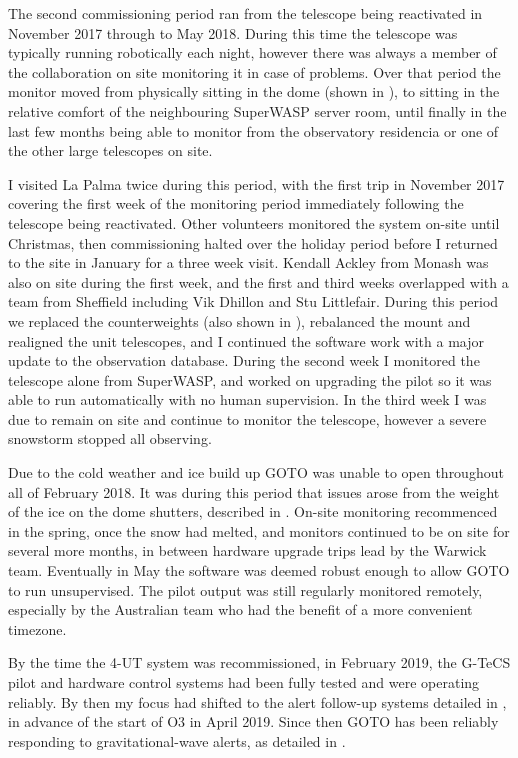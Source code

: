 \begin{colsection}
\begin{colsection}
The second commissioning period ran from the telescope being reactivated in November 2017 through to May 2018. During this time the telescope was typically running robotically each night, however there was always a member of the collaboration on site monitoring it in case of problems. Over that period the monitor moved from physically sitting in the dome (shown in ), to sitting in the relative comfort of the neighbouring SuperWASP server room, until finally in the last few months being able to monitor from the observatory residencia or one of the other large telescopes on site.

I visited La Palma twice during this period, with the first trip in November 2017 covering the first week of the monitoring period immediately following the telescope being reactivated. Other volunteers monitored the system on-site until Christmas, then commissioning halted over the holiday period before I returned to the site in January for a three week visit. Kendall Ackley from Monash was also on site during the first week, and the first and third weeks overlapped with a team from Sheffield including Vik Dhillon and Stu Littlefair. During this period we replaced the counterweights (also shown in ), rebalanced the mount and realigned the unit telescopes, and I continued the software work with a major update to the observation database. During the second week I monitored the telescope alone from SuperWASP, and worked on upgrading the pilot so it was able to run automatically with no human supervision. In the third week I was due to remain on site and continue to monitor the telescope, however a severe snowstorm stopped all observing.

Due to the cold weather and ice build up GOTO was unable to open throughout all of February 2018. It was during this period that issues arose from the weight of the ice on the dome shutters, described in . On-site monitoring recommenced in the spring, once the snow had melted, and monitors continued to be on site for several more months, in between hardware upgrade trips lead by the Warwick team. Eventually in May the software was deemed robust enough to allow GOTO to run unsupervised. The pilot output was still regularly monitored remotely, especially by the Australian team who had the benefit of a more convenient timezone.

By the time the 4-UT system was recommissioned, in February 2019, the G-TeCS pilot and hardware control systems had been fully tested and were operating reliably. By then my focus had shifted to the alert follow-up systems detailed in , in advance of the start of O3 in April 2019. Since then GOTO has been reliably responding to gravitational-wave alerts, as detailed in .


\end{colsection}
\end{colsection}
